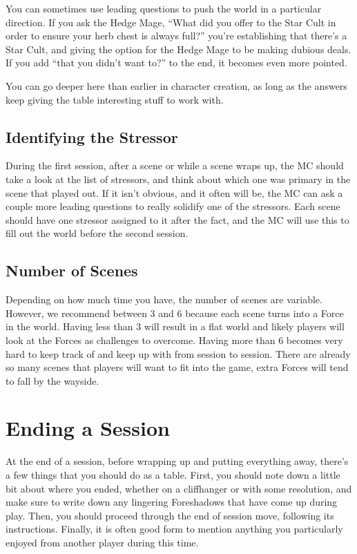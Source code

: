 \documentclass[10pt,twoside,openright]{memoir}
\begin{document}
You can sometimes use leading questions to push the world in a
particular direction. If you ask the Hedge Mage, ``What did you offer to
the Star Cult in order to ensure your herb chest is always full?''
you're establishing that there's a Star Cult, and giving the option for
the Hedge Mage to be making dubious deals. If you add ``that you didn't
want to?'' to the end, it becomes even more pointed.

You can go deeper here than earlier in character creation, as long as
the answers keep giving the table interesting stuff to work with.

\hypertarget{identifying-the-stressor}{%
\subsection{Identifying the Stressor}\label{identifying-the-stressor}}

During the first session, after a scene or while a scene wraps up, the
MC should take a look at the list of stressors, and think about which
one was primary in the scene that played out. If it isn't obvious, and
it often will be, the MC can ask a couple more leading questions to
really solidify one of the stressors. Each scene should have one
stressor assigned to it after the fact, and the MC will use this to fill
out the world before the second session.

\hypertarget{number-of-scenes}{%
\subsection{Number of Scenes}\label{number-of-scenes}}

Depending on how much time you have, the number of scenes are variable.
However, we recommend between 3 and 6 because each scene turns into a
Force in the world. Having less than 3 will result in a flat world and
likely players will look at the Forces as challenges to overcome. Having
more than 6 becomes very hard to keep track of and keep up with from
session to session. There are already so many scenes that players will
want to fit into the game, extra Forces will tend to fall by the
wayside.

\hypertarget{ending-a-session-1}{%
\section{Ending a Session}\label{ending-a-session-1}}

At the end of a session, before wrapping up and putting everything away,
there's a few things that you should do as a table. First, you should
note down a little bit about where you ended, whether on a cliffhanger
or with some resolution, and make sure to write down any lingering
Foreshadows that have come up during play. Then, you should proceed
through the end of session move, following its instructions. Finally, it
is often good form to mention anything you particularly enjoyed from
another player during this time.
\end{document}
